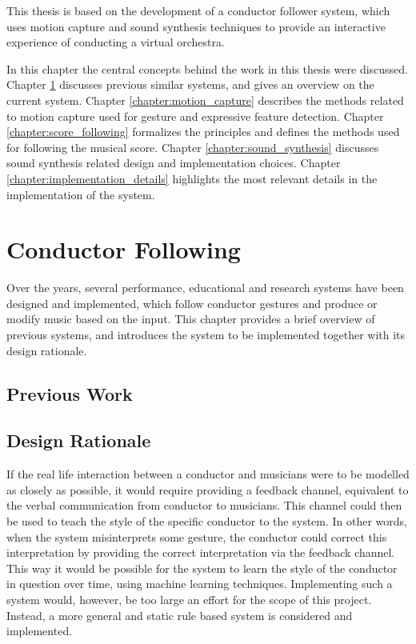 This thesis is based on the development of
a conductor follower system,
which uses motion capture and sound synthesis techniques
to provide an interactive experience of conducting a virtual orchestra.

In this chapter the central concepts behind
the work in this thesis were discussed.
Chapter \ref{chapter:conductor_following} discusses
previous similar systems, and gives an overview on the current system.
Chapter \ref{chapter:motion_capture} describes the
methods related to motion capture used for
gesture and expressive feature detection.
Chapter \ref{chapter:score_following}
formalizes the principles
and defines the methods used for following the musical score.
Chapter \ref{chapter:sound_synthesis}
discusses sound synthesis related design and
implementation choices.
Chapter \ref{chapter:implementation_details}
highlights the most relevant details
in the implementation of the system.

\chapter{Conductor Following}
\label{chapter:conductor_following}

Over the years, several performance, educational and research systems
have been designed and implemented,
which follow conductor gestures and produce or modify music based on the input.
This chapter provides a brief overview of previous systems,
and introduces the system to be implemented together with its design rationale.


\section{Previous Work}

\section{Design Rationale}

If the real life interaction between a conductor and musicians
were to be modelled as closely as possible,
it would require providing a feedback channel,
equivalent to the verbal communication from conductor to musicians.
This channel could then be used to teach the
style of the specific conductor to the system.
In other words, when the system misinterprets some gesture,
the conductor could correct this interpretation by 
providing the correct interpretation via the feedback channel.
This way it would be possible for the system to
learn the style of the conductor in question over time,
using machine learning techniques.
Implementing such a system would, however,
be too large an effort for the scope of this project.
Instead, a more general and static rule based system is
considered and implemented.

